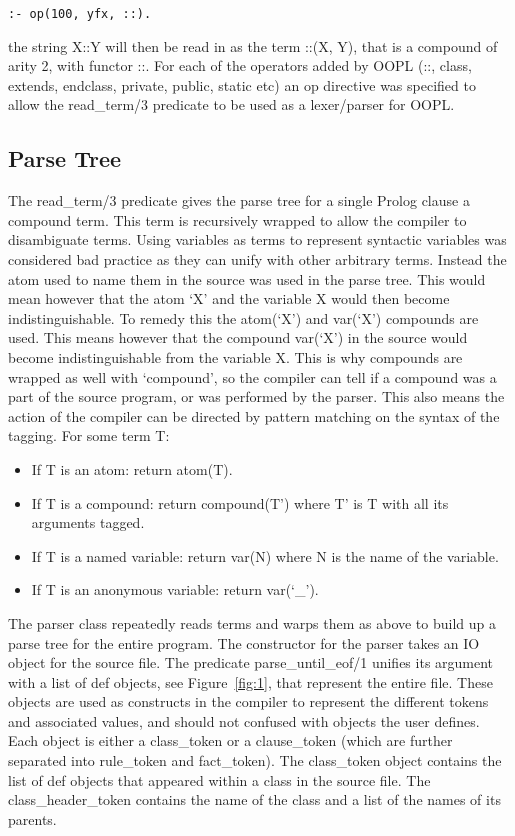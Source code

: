 \documentclass[12pt,a4paper,twoside,openright]{report}
\begin{document}
\begin{verbatim}
:- op(100, yfx, ::).
\end{verbatim}

\noindent the string X::Y will then be read in as the term ::(X, Y), that is a compound of arity 2, with functor ::. For each of the operators added by OOPL (::, class, extends, endclass, private, public, static etc) an op directive was specified to allow the read_term/3 predicate to be used as a lexer/parser for OOPL.

\subsection{Parse Tree}

The read_term/3 predicate gives the parse tree for a single Prolog clause a compound term. This term is recursively wrapped to allow the compiler to disambiguate terms. Using variables as terms to represent syntactic variables was considered bad practice as they can unify with other arbitrary terms. Instead the atom used to name them in the source was used in the parse tree. This would mean however that the atom `X' and the variable X would then become indistinguishable. To remedy this the atom(`X') and var(`X') compounds are used. This means however that the compound var(`X') in the source would become indistinguishable from the variable X. This is why compounds are wrapped as well with `compound', so the compiler can tell if a compound was a part of the source program, or was performed by the parser. This also means the action of the compiler can be directed by pattern matching on the syntax of the tagging. For some term T:

\begin{itemize}
	\item{If T is an atom: return atom(T).}
	\item{If T is a compound: return compound(T') where T' is T with all its arguments tagged.}
	\item{If T is a named variable: return var(N) where N is the name of the variable.}
	\item{If T is an anonymous variable: return var(`_').}
\end{itemize}

\bigskip

The parser class repeatedly reads terms and warps them as above to build up a parse tree for the entire program. The constructor for the parser takes an IO object for the source file. The predicate parse_until_eof/1 unifies its argument with a list of def objects, see Figure~\ref{fig:1}, that represent the entire file. These objects are used as constructs in the compiler to represent the different tokens and associated values, and should not confused with objects the user defines. Each object is either a class_token or a clause_token (which are further separated into rule_token  and fact_token). The class_token object contains the list of def objects that appeared within a class in the source file. The class_header_token contains the name of the class and a list of the names of its parents.
\end{document}
